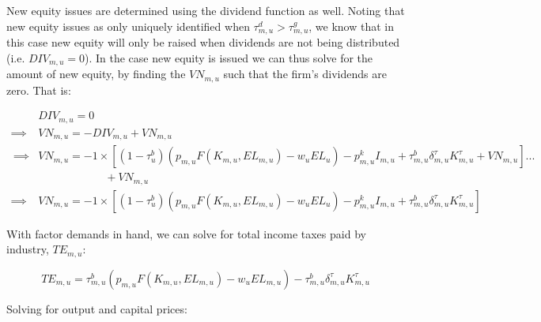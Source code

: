 \documentclass[letterpaper,12pt]{article}
\theoremstyle{definition}
\begin{document}
\begin{spacing}{1.5}
New equity issues are determined using the dividend function as well. Noting that new equity issues as only uniquely identified when $\tau^{d}_{m,u}>\tau^{g}_{m,u}$, we know that in this case new equity will only be raised when dividends are not being distributed (i.e. $DIV_{m,u}=0$).  In the case new equity is issued we can thus solve for the amount of new equity, by finding the $VN_{m,u}$ such that the firm's dividends are zero.  That is:

\begin{equation}
\begin{split}
& DIV_{m,u} = 0 \\
\implies & VN_{m,u} = -DIV_{m,u} + VN_{m,u}\\\
\implies & VN_{m,u} = -1\times \left[(1-\tau^{b}_{u})\left(p_{m,u}F(K_{m,u},EL_{m,u})-w_{u}EL_{u}\right) - p^{k}_{m,u}I_{m,u}+\tau^{b}_{m,u}\delta^{\tau}_{m,u}K^{\tau}_{m,u}+VN_{m,u}\right] ... \\
&\quad\quad\quad\quad\quad\quad+ VN_{m,u} \\
\implies & VN_{m,u} = -1\times \left[(1-\tau^{b}_{u})\left(p_{m,u}F(K_{m,u},EL_{m,u})-w_{u}EL_{u}\right) - p^{k}_{m,u}I_{m,u}+\tau^{b}_{m,u}\delta^{\tau}_{m,u}K^{\tau}_{m,u}\right]   
 \end{split}
\end{equation} 
  

With factor demands in hand, we can solve for total income taxes paid by industry, $TE_{m,u}$:

\begin{equation}
\label{eqn:inc_tax_firm}
TE_{m,u} = \tau^{b}_{m,u}\left(p_{m,u}F(K_{m,u},EL_{m,u})-w_{u}EL_{m,u} \right) - \tau^{b}_{m,u}\delta^{\tau}_{m,u}K^{\tau}_{m,u}
\end{equation}


Solving for output and capital prices:


\end{spacing}
\end{document}
